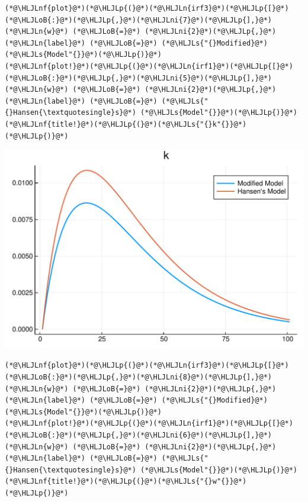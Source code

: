 \documentclass[12pt,a4paper]{article}
\newcommand{\HLJLn}[1]{#1}
\newcommand{\HLJLnf}[1]{\textcolor[RGB]{66,102,213}{#1}}
\newcommand{\HLJLs}[1]{\textcolor[RGB]{201,61,57}{#1}}
\newcommand{\HLJLni}[1]{\textcolor[RGB]{59,151,46}{#1}}
\newcommand{\HLJLoB}[1]{\textcolor[RGB]{102,102,102}{\textbf{#1}}}
\newcommand{\HLJLp}[1]{#1}
\begin{document}
\begin{lstlisting}
(*@\HLJLnf{plot}@*)(*@\HLJLp{(}@*)(*@\HLJLn{irf3}@*)(*@\HLJLp{[}@*)(*@\HLJLoB{:}@*)(*@\HLJLp{,}@*)(*@\HLJLni{7}@*)(*@\HLJLp{],}@*) (*@\HLJLn{w}@*) (*@\HLJLoB{=}@*) (*@\HLJLni{2}@*)(*@\HLJLp{,}@*) (*@\HLJLn{label}@*) (*@\HLJLoB{=}@*) (*@\HLJLs{"{}Modified}@*) (*@\HLJLs{Model"{}}@*)(*@\HLJLp{)}@*)
(*@\HLJLnf{plot!}@*)(*@\HLJLp{(}@*)(*@\HLJLn{irf1}@*)(*@\HLJLp{[}@*)(*@\HLJLoB{:}@*)(*@\HLJLp{,}@*)(*@\HLJLni{5}@*)(*@\HLJLp{],}@*) (*@\HLJLn{w}@*) (*@\HLJLoB{=}@*) (*@\HLJLni{2}@*)(*@\HLJLp{,}@*) (*@\HLJLn{label}@*) (*@\HLJLoB{=}@*) (*@\HLJLs{"{}Hansen{\textquotesingle}s}@*) (*@\HLJLs{Model"{}}@*)(*@\HLJLp{)}@*)
(*@\HLJLnf{title!}@*)(*@\HLJLp{(}@*)(*@\HLJLs{"{}k"{}}@*)(*@\HLJLp{)}@*)
\end{lstlisting}

\includegraphics[width=\linewidth]{figures/yvan_18_1.pdf}

\begin{lstlisting}
(*@\HLJLnf{plot}@*)(*@\HLJLp{(}@*)(*@\HLJLn{irf3}@*)(*@\HLJLp{[}@*)(*@\HLJLoB{:}@*)(*@\HLJLp{,}@*)(*@\HLJLni{8}@*)(*@\HLJLp{],}@*) (*@\HLJLn{w}@*) (*@\HLJLoB{=}@*) (*@\HLJLni{2}@*)(*@\HLJLp{,}@*) (*@\HLJLn{label}@*) (*@\HLJLoB{=}@*) (*@\HLJLs{"{}Modified}@*) (*@\HLJLs{Model"{}}@*)(*@\HLJLp{)}@*)
(*@\HLJLnf{plot!}@*)(*@\HLJLp{(}@*)(*@\HLJLn{irf1}@*)(*@\HLJLp{[}@*)(*@\HLJLoB{:}@*)(*@\HLJLp{,}@*)(*@\HLJLni{6}@*)(*@\HLJLp{],}@*) (*@\HLJLn{w}@*) (*@\HLJLoB{=}@*) (*@\HLJLni{2}@*)(*@\HLJLp{,}@*) (*@\HLJLn{label}@*) (*@\HLJLoB{=}@*) (*@\HLJLs{"{}Hansen{\textquotesingle}s}@*) (*@\HLJLs{Model"{}}@*)(*@\HLJLp{)}@*)
(*@\HLJLnf{title!}@*)(*@\HLJLp{(}@*)(*@\HLJLs{"{}w"{}}@*)(*@\HLJLp{)}@*)
\end{lstlisting}
\end{document}
